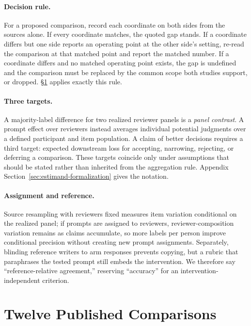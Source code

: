 \documentclass[11pt]{article}
\begin{document}


\paragraph{Decision rule.}
For a proposed comparison, record each coordinate on both sides from the
sources alone. If every coordinate matches, the quoted gap stands. If a
coordinate differs but one side reports an operating point at the other side's
setting, re-read the comparison at that matched point and report the matched
number. If a coordinate differs and no matched operating point exists, the gap
is undefined and the comparison must be replaced by the common scope both
studies support, or dropped. \S\ref{sec:cases} applies exactly this rule.

\paragraph{Three targets.}
A majority-label difference for two realized reviewer panels is a
\emph{panel contrast}. A prompt effect over reviewers instead averages
individual potential judgments over a defined participant and item population.
A claim of better decisions requires a third target: expected downstream loss
for accepting, narrowing, rejecting, or deferring a comparison. These targets
coincide only under assumptions that should be stated rather than inherited
from the aggregation rule. Appendix
Section~\ref{sec:estimand-formalization} gives the notation.

\paragraph{Assignment and reference.}
Source resampling with reviewers fixed measures item variation conditional on
the realized panel; if prompts are assigned to reviewers, reviewer-composition
variation remains as claims accumulate, so more labels per person improve
conditional precision without creating new prompt assignments. Separately,
blinding reference writers to arm responses prevents copying, but a rubric that
paraphrases the tested prompt still embeds the intervention. We therefore say
``reference-relative agreement,'' reserving ``accuracy'' for an
intervention-independent criterion.

\section{Twelve Published Comparisons}
\label{sec:cases}
\end{document}
